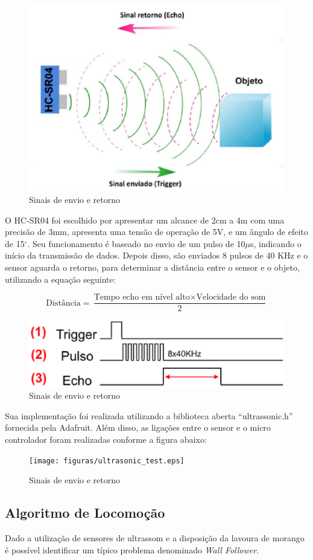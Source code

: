 	\begin{figure}[!htbp]
		\begin{center}
			\includegraphics[width=.4\textwidth]{figuras/echo.eps}
			\caption{Sinais de envio e retorno}
		\end{center}
	\end{figure}

O HC-SR04 foi escolhido por apresentar um alcance de 2cm a 4m com uma precisão de 3mm, apresenta uma tensão de operação de 5V, e um ângulo de efeito de 15$^{\circ}$. Seu funcionamento é baseado no envio de um pulso de 10$\mu$s, indicando o início da transmissão de dados. Depois disso, são enviados 8 pulsos de 40 KHz e o sensor aguarda o retorno, para determinar a distância entre o sensor e o objeto, utilizando a equação seguinte:

$$
\textrm{Distância} = \frac{\textrm{Tempo echo em nível alto} \times \textrm{Velocidade do som}}{2}
$$

	\begin{figure}[!htbp]
		\begin{center}
			\includegraphics[width=.4\textwidth]{figuras/hcsr04_signals.eps}
			\caption{Sinais de envio e retorno}
		\end{center}
	\end{figure}

Sua implementação foi realizada utilizando a biblioteca aberta “ultrassonic.h” fornecida pela Adafruit. Além disso, as ligações entre o sensor e o micro controlador foram realizadas conforme a figura abaixo:

	\begin{figure}[!htbp]
		\begin{center}
			\texttt{[image: figuras/ultrasonic\_test.eps]}
			\caption{Sinais de envio e retorno}
		\end{center}
	\end{figure}


  \subsection{Algoritmo de Locomoção}
    Dado a utilização de sensores de ultrassom e a disposição da lavoura de morango
    é possível identificar um típico problema denominado \textit{Wall Follower}.

